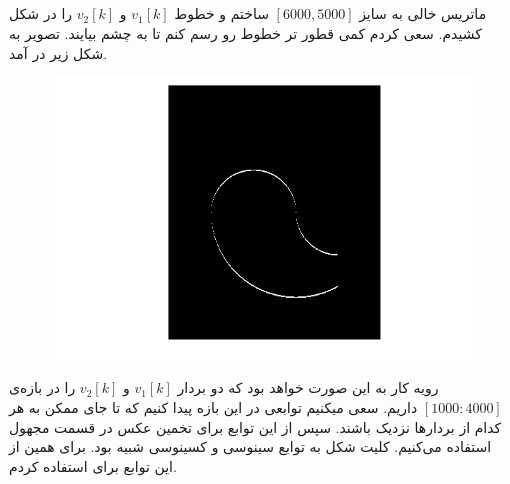 \documentclass[a4paper]{article}
\begin{document}
\subsection{}
ماتریس خالی به سایز 
$ [6000,5000] $
ساختم و خطوط 
$ v_{1}[k] $
و
$ v_{2}[k] $
را در شکل کشیدم. سعی کردم کمی قطور تر خطوط رو رسم کنم تا به چشم بیایند. تصویر به شکل زیر در آمد. 
\begin{figure}[H]
	\centering
	\includegraphics[width=0.75 \linewidth]{heatmap}
	\caption{
	}
\end{figure}
رویه کار به این صورت خواهد بود که دو بردار 
$ v_{1}[k] $
و
$ v_{2}[k] $
را در بازه‌ی 
$ [1000:4000] $
داریم. سعی میکنیم توابعی در این بازه پیدا کنیم که تا جای ممکن به هر کدام از بردارها نزدیک باشند. سپس از این توابع برای تخمین عکس در قسمت مجهول استفاده می‌کنیم. 
کلیت شکل به توابع سینوسی و کسینوسی شبیه بود. برای همین از این توابع برای 
استفاده کردم.
\end{document}
